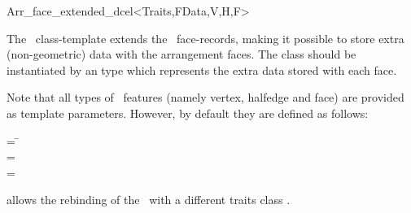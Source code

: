 
\ccRefPageBegin

\begin{ccRefClass}{Arr_face_extended_dcel<Traits,FData,V,H,F>}

\ccDefinition

The \ccRefName\ class-template extends the \dcel\ face-records, making it
possible to store extra (non-geometric) data with the arrangement faces.
The class should be instantiated by an  type which represents the
extra data stored with each face. 

Note that all types of \dcel\ features (namely vertex, halfedge and face)
are provided as template parameters. However, by default they are defined
as follows:

\begin{tabbing}
 = \=\\
 = \>\\
 = \>
\end{tabbing}


\ccIsModel

\ccInheritsFrom

\ccTypes

  {allows the rebinding of the \dcel\ with a different traits class .}

\ccSeeAlso


\end{ccRefClass}

\ccRefPageEnd
